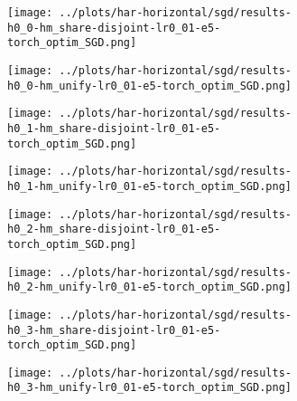 \begin{figure}[htbp]  %
    \centering
    \begin{subfigure}[b]{0.47\textwidth}
        \centering
        \texttt{[image: ../plots/har-horizontal/sgd/results-h0\_0-hm\_share-disjoint-lr0\_01-e5-torch\_optim\_SGD.png]}
    \end{subfigure}
    \hfill
    \begin{subfigure}[b]{0.47\textwidth}
        \centering
        \texttt{[image: ../plots/har-horizontal/sgd/results-h0\_0-hm\_unify-lr0\_01-e5-torch\_optim\_SGD.png]}
    \end{subfigure}
\end{figure}
\begin{figure}[htbp]  %
    \centering
    \begin{subfigure}[b]{0.47\textwidth}
        \centering
        \texttt{[image: ../plots/har-horizontal/sgd/results-h0\_1-hm\_share-disjoint-lr0\_01-e5-torch\_optim\_SGD.png]}
    \end{subfigure}
    \hfill
    \begin{subfigure}[b]{0.47\textwidth}
        \centering
        \texttt{[image: ../plots/har-horizontal/sgd/results-h0\_1-hm\_unify-lr0\_01-e5-torch\_optim\_SGD.png]}
    \end{subfigure}
\end{figure}
\begin{figure}[htbp]  %
    \centering
    \begin{subfigure}[b]{0.47\textwidth}
        \centering
        \texttt{[image: ../plots/har-horizontal/sgd/results-h0\_2-hm\_share-disjoint-lr0\_01-e5-torch\_optim\_SGD.png]}
    \end{subfigure}
    \hfill
    \begin{subfigure}[b]{0.47\textwidth}
        \centering
        \texttt{[image: ../plots/har-horizontal/sgd/results-h0\_2-hm\_unify-lr0\_01-e5-torch\_optim\_SGD.png]}
    \end{subfigure}
\end{figure}
\begin{figure}[htbp]  %
    \centering
    \begin{subfigure}[b]{0.47\textwidth}
        \centering
        \texttt{[image: ../plots/har-horizontal/sgd/results-h0\_3-hm\_share-disjoint-lr0\_01-e5-torch\_optim\_SGD.png]}
    \end{subfigure}
    \hfill
    \begin{subfigure}[b]{0.47\textwidth}
        \centering
        \texttt{[image: ../plots/har-horizontal/sgd/results-h0\_3-hm\_unify-lr0\_01-e5-torch\_optim\_SGD.png]}
    \end{subfigure}
\end{figure}
